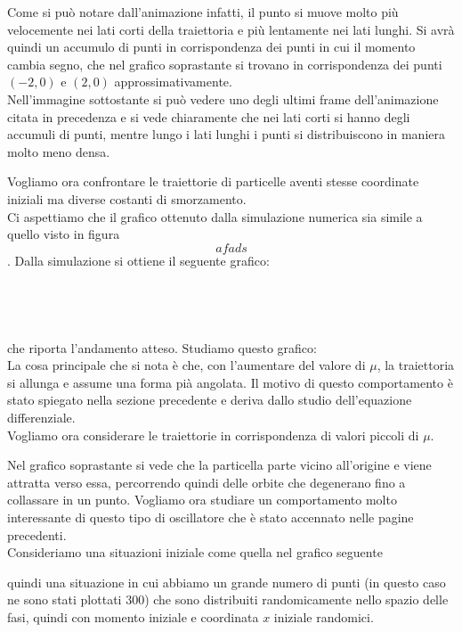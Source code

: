 \documentclass[12pt]{article}
\begin{document}
Come si può notare dall'animazione infatti, il punto si muove molto più velocemente nei lati corti della traiettoria e più lentamente nei lati lunghi. Si avrà quindi un accumulo di punti in corrispondenza dei punti in cui il momento cambia segno,
che nel grafico soprastante si trovano in corrispondenza dei punti $(-2,0)$ e $(2,0)$ approssimativamente. \\
Nell'immagine sottostante si può vedere uno degli ultimi frame dell'animazione citata in precedenza e si vede chiaramente che nei lati corti si hanno degli accumuli di punti, mentre lungo i lati lunghi i punti si distribuiscono in maniera molto meno densa. 
\begin{figure}[H]
	\centering
	
\end{figure}
Vogliamo ora confrontare le traiettorie di particelle aventi stesse coordinate iniziali ma diverse costanti di smorzamento. \\
Ci aspettiamo che il grafico ottenuto dalla simulazione numerica sia simile a quello visto in figura $$ afads $$. Dalla simulazione si ottiene il seguente grafico: \\ \\ \\ \\ \\
che riporta l'andamento atteso. Studiamo questo grafico: \\
La cosa principale che si nota è che, con l'aumentare del valore di $\mu$, la traiettoria si allunga e assume una forma pià angolata. Il motivo di questo comportamento è stato spiegato nella sezione precedente e deriva dallo studio dell'equazione differenziale. \\
Vogliamo ora considerare le traiettorie in corrispondenza di valori piccoli di $\mu$. 
\begin{figure}[H]
	\centering
	
\end{figure}
Nel grafico soprastante si vede che la particella parte vicino all'origine e viene attratta verso essa, percorrendo quindi delle orbite che degenerano fino a collassare in un punto.
Vogliamo ora studiare un comportamento molto interessante di questo tipo di oscillatore che è stato accennato nelle pagine precedenti. \\
Consideriamo una situazioni iniziale come quella nel grafico seguente 
\begin{figure}[H]
	\centering
	
\end{figure}
quindi una situazione in cui abbiamo un grande numero di punti (in questo caso ne sono stati plottati 300) che sono distribuiti randomicamente nello spazio delle fasi, quindi con momento iniziale e coordinata $x$ iniziale randomici. \\
\end{document}
